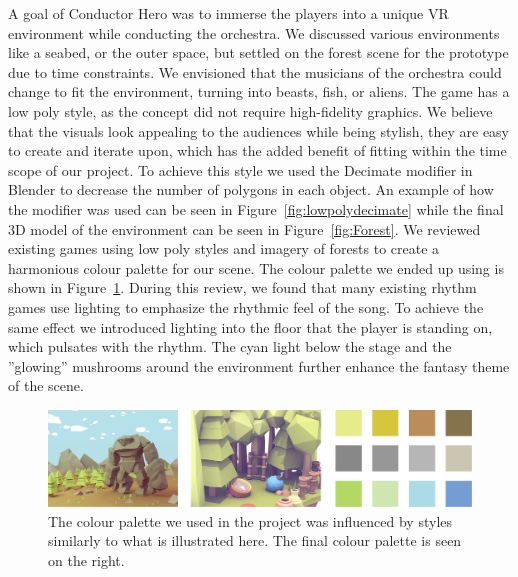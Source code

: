 A goal of Conductor Hero was to immerse the players into a unique VR environment while conducting the orchestra. We discussed various environments like a seabed, or the outer space, but settled on the forest scene for the prototype due to time constraints. We envisioned that the musicians of the orchestra could change to fit the environment, turning into beasts, fish, or aliens. The game has a low poly style, as the concept did not require high-fidelity graphics. We believe that the visuals look appealing to the audiences while being stylish, they are easy to create and iterate upon, which has the added benefit of fitting within the time scope of our project. To achieve this style we used the Decimate modifier in Blender to decrease the number of polygons in each object. An example of how the modifier was used can be seen in Figure~\ref{fig:lowpolydecimate} while the final 3D model of the environment can be seen in Figure~\ref{fig:Forest}. We reviewed existing games using low poly styles and imagery of forests to create a harmonious colour palette for our scene. The colour palette we ended up using is shown in Figure~\ref{fig:colourpalette}. During this review, we found that many existing rhythm games use lighting to emphasize the rhythmic feel of the song. To achieve the same effect we introduced lighting into the floor that the player is standing on, which pulsates with the rhythm. The cyan light below the stage and the ''glowing'' mushrooms around the environment further enhance the fantasy theme of the scene.

\begin{figure}[H]
\centering
    \includegraphics[width=1.0\textwidth]{images/sceneColourPalette}
    \caption[The colour palette for the ingame scene]{The colour palette we used in the project was influenced by styles similarly to what is illustrated here. The final colour palette is seen on the right. }
    \label{fig:colourpalette}
\end{figure}
